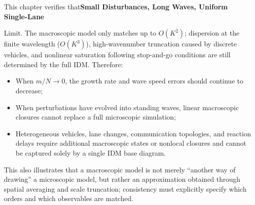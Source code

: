\documentclass[11pt,a4paper,openany]{book}
\numberwithin{equation}{chapter}
\numberwithin{figure}{chapter}
\numberwithin{table}{chapter}
\begin{document}
This chapter verifies that\textbf{Small Disturbances, Long Waves, Uniform Single-Lane}




Limit. The macroscopic model only matches up to $O(K^2)$; dispersion at the finite wavelength ($O(K^3)$), high-wavenumber truncation caused by discrete vehicles, and nonlinear saturation following stop-and-go conditions are still determined by the full IDM. Therefore:







\begin{itemize}[leftmargin=1.4em,itemsep=3pt]
\item




When $m/N\to0$, the growth rate and wave speed errors should continue to decrease;







\item




When perturbations have evolved into standing waves, linear macroscopic closures cannot replace a full microscopic simulation;







\item




Heterogeneous vehicles, lane changes, communication topologies, and reaction delays require additional macroscopic states or nonlocal closures and cannot be captured solely by a single IDM base diagram.







\end{itemize}







This also illustrates that a macroscopic model is not merely “another way of drawing” a microscopic model, but rather an approximation obtained through spatial averaging and scale truncation; consistency must explicitly specify which orders and which observables are matched.




\end{document}
